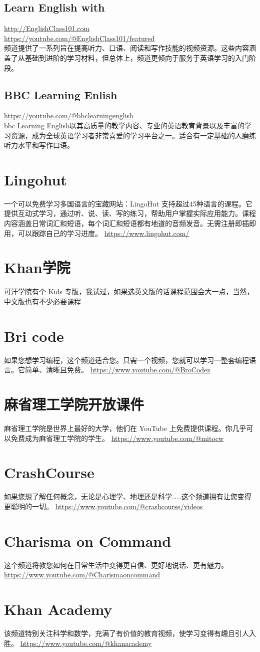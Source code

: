 \documentclass[11pt]{article}
\begin{document}
\subsection{Learn English with}
\label{sec:orgf60a514}
\url{http://EnglishClass101.com} \\
\url{https://youtube.com/@EnglishClass101/featured} \\
频道提供了一系列旨在提高听力、口语、阅读和写作技能的视频资源。这些内容涵盖了从基础到进阶的学习材料，但总体上，频道更倾向于服务于英语学习的入门阶段。

\subsection{BBC Learning Enlish}
\label{sec:orgb0a94f4}
\url{https://youtube.com/@bbclearningenglish} \\
bbc Learning English以其高质量的教学内容、专业的英语教育背景以及丰富的学习资源，成为全球英语学习者非常喜爱的学习平台之一。适合有一定基础的人磨练听力水平和写作口语。

\section{Lingohut}
\label{sec:org4ab6a05}
一个可以免费学习多国语言的宝藏网站：LingoHut
支持超过45种语言的课程。它提供互动式学习，通过听、说、读、写的练习，帮助用户掌握实际应用能力。课程内容涵盖日常词汇和短语，每个词汇和短语都有地道的音频发音。无需注册即插即用，可以跟踪自己的学习进度。
\url{https://www.lingohut.com/}
\section{Khan学院}
\label{sec:orgb104150}
可汗学院有个 Kids 专版，我试过，如果选英文版的话课程范围会大一点，当然，中文版也有不少必要课程

\section{Bri code}
\label{sec:org2ef6b49}
如果您想学习编程，这个频道适合您。只需一个视频，您就可以学习一整套编程语言。它简单、清晰且免费。
\url{https://www.youtube.com/@BroCodez}
\section{麻省理工学院开放课件}
\label{sec:orga942fc8}
麻省理工学院是世界上最好的大学，他们在 YouTube 上免费提供课程。你几乎可以免费成为麻省理工学院的学生。
\url{https://www.youtube.com/@mitocw}
\section{CrashCourse}
\label{sec:org2bf3ed7}
如果您想了解任何概念，无论是心理学、地理还是科学……这个频道拥有让您变得更聪明的一切。
\url{https://www.youtube.com/@crashcourse/videos}
\section{Charisma on Command}
\label{sec:orge8c76c0}
这个频道将教您如何在日常生活中变得更自信、更好地说话、更有魅力。
\url{https://www.youtube.com/@Charismaoncommand}
\section{Khan Academy}
\label{sec:org0a6c47e}
该频道特别关注科学和数学，充满了有价值的教育视频，使学习变得有趣且引人入胜。
\url{https://www.youtube.com/@khanacademy}
\end{document}
